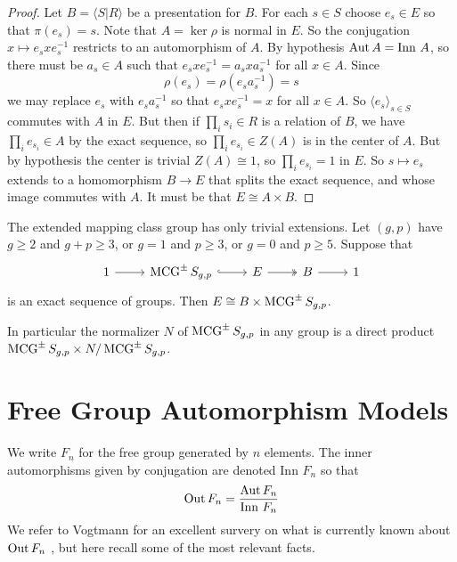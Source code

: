 \begin{proof}
Let $B = \langle S | R \rangle$
be a presentation for $B$.
For each $s\in S$ choose $e_s \in E$
so that $\pi(e_s) =s$.
Note that $A = \ker \rho$ is normal in $E$.
So the conjugation
$x \mapsto e_s x e_s^{-1}$
restricts to an automorphism of $A$.
By hypothesis $\operatorname{Aut} A = \mbox{Inn } A$,
so there must be $a_s \in A$ such that
$e_sx e_s^{-1} =a_s x a_s^{-1}$ for all $x \in A$.
Since
$$
\rho (e_s) = \rho (e_sa^{-1}_s) = s
$$
we may replace $e_s$ with $e_sa^{-1}_s$
so that $e_sxe^{-1}_s = x$ for all $x \in A$.
So $\langle e_s \rangle_{s \in S}$ commutes with $A$ in $E$.
But then if $\prod_i s_i \in R$ is a relation of $B$,
we have $\prod_i e_{s_i}  \in A$ by the exact sequence,
so $\prod_i e_{s_i} \in Z(A)$ is in the center of $A$.
But by hypothesis the center is trivial $Z(A) \cong 1$, so $\prod_i e_{s_i}=1$ in $E$.
So $s \mapsto e_s$ extends to a homomorphism $B \to E$ that splits the exact sequence,
and whose image commutes with $A$.
It must be that $E \cong A \times B$.
\end{proof}

\begin{corollary} The extended mapping class group has only trivial extensions.
  \label{cor:nomodextensions}
  Let $(g,p)$ have $g\geq 2$ and $g+p \geq 3$,
  or $g=1$ and $p\geq 3$, or $g=0$ and $p \geq 5$.
  Suppose that
  $$
  \begin{tikzcd}
    1 \arrow[r] &
    \mcg^{\pm} S_{g,p} \arrow[hook,r]&
    E \arrow[two heads]{r}&
    B \arrow[r]&
    1
  \end{tikzcd}
  $$
  is an exact sequence of groups.
  Then $E \cong B \times \operatorname{MCG}^{\pm} S_{g,p}$.
\end{corollary}

In particular the normalizer $N$ of $\operatorname{MCG}^{\pm} S_{g,p}$
in any group is a direct product  $\operatorname{MCG}^{\pm} S_{g,p} \times N/\operatorname{MCG}^{\pm} S_{g,p}$.


\section{Free Group Automorphism Models}

We write $F_n$ for the free group generated by $n$ elements.
The inner automorphisms given by conjugation are denoted $\mbox{Inn } F_n$
so that
$$
\operatorname{Out} F_n = \frac{\operatorname{Aut} F_n}{\mbox{Inn } F_n}
$$
We refer to Vogtmann for an excellent survery on
what is currently known about $\operatorname{Out} F_n$
\cite{VogtmannKaren2002Gd}, but here recall some
of the most relevant facts.

